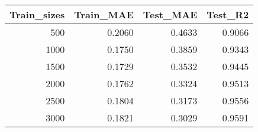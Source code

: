 \begin{tabular}{rrrr}
\toprule
Train_sizes & Train_MAE & Test_MAE & Test_R2 \\
\midrule
500 & 0.2060 & 0.4633 & 0.9066 \\
1000 & 0.1750 & 0.3859 & 0.9343 \\
1500 & 0.1729 & 0.3532 & 0.9445 \\
2000 & 0.1762 & 0.3324 & 0.9513 \\
2500 & 0.1804 & 0.3173 & 0.9556 \\
3000 & 0.1821 & 0.3029 & 0.9591 \\
\bottomrule
\end{tabular}
